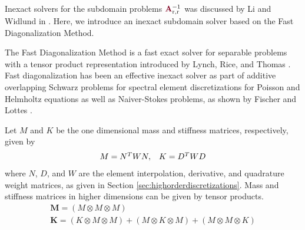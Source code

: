 Inexact solvers for the subdomain problems ${\color{burgundy}\mathbf{A}}_{\text{r}, \text{r}}^{-1}$ was discussed by Li and Widlund in \cite{li2007use}.
Here, we introduce an inexact subdomain solver based on the Fast Diagonalization Method.

The Fast Diagonalization Method is a fast exact solver for separable problems with a tensor product representation introduced by Lynch, Rice, and Thomas \cite{lynch1964direct}.
Fast diagonalization has been an effective inexact solver as part of additive overlapping Schwarz problems for spectral element discretizations for Poisson and Helmholtz equations as well as Naiver-Stokes problems, as shown by Fischer and Lottes \cite{fischer2005hybrid}.

Let $M$ and $K$ be the one dimensional mass and stiffness matrices, respectively, given by
\begin{equation}
\begin{array}{c c}
M = N^T W N,  &  K = D^T W D
\end{array}
\end{equation}
where $N$, $D$, and $W$ are the element interpolation, derivative, and quadrature weight matrices, as given in Section \ref{sec:highorderdiscretizations}.
Mass and stiffness matrices in higher dimensions can be given by tensor products.
\begin{equation}
\begin{array}{c}
\mathbf{M} = \left( M \otimes M \otimes M \right)  \\
\mathbf{K} = \left( K \otimes M \otimes M \right) + \left( M \otimes K \otimes M \right) + \left( M \otimes M \otimes K \right)  \\
\end{array}
\end{equation}

